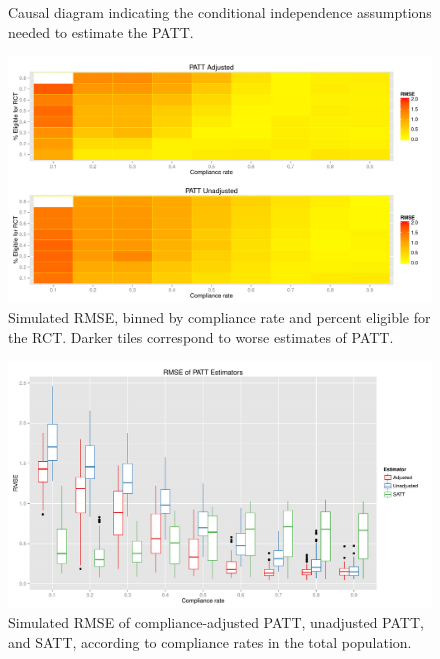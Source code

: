 \documentclass[12pt]{article}
\begin{document}
\pagebreak
\begin{appendices}

\begin{figure}[htb]
\centering
{}
\caption{Causal diagram indicating the conditional independence assumptions needed to estimate the PATT.}\label{fig:DAG}
\end{figure}

\begin{figure}[htbp]
\begin{center}
\includegraphics[width = 1\textwidth]{rmse_ratec_rates}
\caption{Simulated RMSE, binned by compliance rate and percent eligible for the RCT. Darker tiles correspond to worse estimates of PATT.}
\label{fig:sim_tiles}
\end{center}
\end{figure}

\begin{figure}[htbp]
\begin{center}
\includegraphics[width = 1\textwidth]{rmse_boxplots}
\caption{Simulated RMSE of compliance-adjusted PATT, unadjusted PATT, and SATT, according to compliance rates in the total population.}
\label{fig:sim_compliance}
\end{center}
\end{figure}


\end{appendices}
\end{document}
